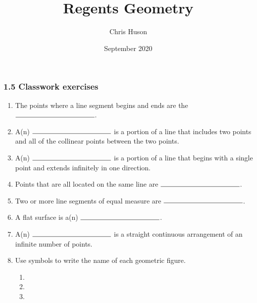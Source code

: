 \documentclass[12pt, twoside]{article}
\title{Regents Geometry}
\author{Chris Huson}
\date{September 2020}
\begin{document}
\subsubsection*{1.5 Classwork exercises}
\begin{enumerate}
\item The points where a line segment begins and ends are the $\rule{4cm}{0.15mm}$. \bigskip
\item A(n) $\rule{4cm}{0.15mm}$ is a portion of a line that includes two points and all of the collinear points between the two points.\bigskip
\item A(n) $\rule{4cm}{0.15mm}$ is a portion of a line that begins with a single point and extends infinitely in one direction.
\item Points that are all located on the same line are $\rule{4cm}{0.15mm}$.\bigskip
\item Two or more line segments of equal measure are $\rule{4cm}{0.15mm}$.\bigskip
\item A flat surface is a(n) $\rule{4cm}{0.15mm}$. \bigskip
\item A(n) $\rule{4cm}{0.15mm}$ is a straight continuous arrangement of an infinite number of points.
    \bigskip
\item Use symbols to write the name of each geometric figure.
  \begin{enumerate}
  \item %
     \bigskip
  \item \hspace{1cm}%
     \bigskip
    \item %
  \end{enumerate}


\end{enumerate}
\end{document}
